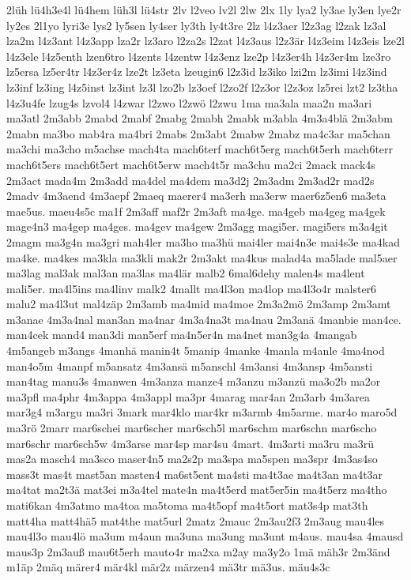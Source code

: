 {2lüh
lü4h3e4l
lü4hem
lüh3l
lü4str
2lv
l2veo
lv2l
2lw
2lx
1ly
lya2
ly3ae
ly3en
lye2r
ly2es
2l1yo
lyri3e
lys2
ly5sen
ly4ser
ly3th
ly4t3re
2lz
l4z3aer
l2z3ag
l2zak
lz3al
lza2m
l4z3ant
l4z3app
lza2r
lz3aro
l2za2s
l2zat
l4z3aus
l2z3är
l4z3eim
l4z3eis
lze2l
l4z3ele
l4z5enth
lzen6tro
l4zents
l4zentw
l4z3enz
lze2p
l4z3er4h
l4z3er4m
lze3ro
lz5ersa
lz5er4tr
l4z3er4z
lze2t
lz3eta
lzeugin6
l2z3id
lz3iko
lzi2m
lz3imi
l4z3ind
lz3inf
lz3ing
l4z5inst
lz3int
lz3l
lzo2b
lz3oef
l2zo2f
l2z3or
l2z3oz
lz5rei
lzt2
lz3tha
l4z3u4fe
lzug4s
lzvol4
l4zwar
l2zwo
l2zwö
l2zwu
1ma
ma3ala
maa2n
ma3ari
ma3atl
2m3abb
2mabd
2mabf
2mabg
2mabh
2mabk
m3abla
4m3a4blä
2m3abm
2mabn
ma3bo
mab4ra
ma4bri
2mabs
2m3abt
2mabw
2mabz
ma4c3ar
ma5chan
ma3chi
ma3cho
m5achse
mach4ta
mach6terf
mach6t5erg
mach6t5erh
mach6terr
mach6t5ers
mach6t5ert
mach6t5erw
mach4t5r
ma3chu
ma2ci
2mack
mack4s
2m3act
mada4m
2m3add
ma4del
ma4dem
ma3d2j
2m3adm
2m3ad2r
mad2s
2madv
4m3aend
4m3aepf
2maeq
maerer4
ma3erh
ma3erw
maer6z5en6
ma3eta
mae5us.
maeu4s5c
ma1f
2m3aff
maf2r
2m3aft
ma4ge.
ma4geb
ma4geg
ma4gek
mage4n3
ma4gep
ma4ges.
ma4gev
ma4gew
2m3agg
magi5er.
magi5ers
m3a4git
2magm
ma3g4n
ma3gri
mah4ler
ma3ho
ma3hü
mai4ler
mai4n3e
mai4s3e
ma4kad
ma4ke.
ma4kes
ma3kla
ma3kli
mak2r
2m3akt
ma4kus
malad4a
ma5lade
mal5aer
ma3lag
mal3ak
mal3an
ma3las
ma4lär
malb2
6mal6dehy
malen4s
ma4lent
mali5er.
ma4l5ins
ma4linv
malk2
4mallt
ma4l3on
ma4lop
ma4l3o4r
malster6
malu2
ma4l3ut
mal4zäp
2m3amb
ma4mid
ma4moe
2m3a2mö
2m3amp
2m3amt
m3anae
4m3a4nal
man3an
ma4nar
4m3a4na3t
ma4nau
2m3anä
4manbie
man4ce.
man4cek
mand4
man3di
man5erf
ma4n5er4n
ma4net
man3g4a
4mangab
4m5angeb
m3angs
4manhä
manin4t
5manip
4manke
4manla
m4anle
4ma4nod
man4o5m
4manpf
m5ansatz
4m3ansä
m5anschl
4m3ansi
4m3ansp
4m5ansti
man4tag
manu3s
4manwen
4m3anza
manze4
m3anzu
m3anzü
ma3o2b
ma2or
ma3pfl
ma4phr
4m3appa
4m3appl
ma3pr
4marag
mar4an
2m3arb
4m3area
mar3g4
m3argu
ma3ri
3mark
mar4klo
mar4kr
m3armb
4m5arme.
mar4o
maro5d
ma3rö
2marr
mar6schei
mar6scher
mar6sch5l
mar6schm
mar6schn
mar6scho
mar6schr
mar6sch5w
4m3arse
mar4sp
mar4su
4mart.
4m3arti
ma3ru
ma3rü
mas2a
masch4
ma3sco
maser4n5
ma2s2p
ma3spa
ma5spen
ma3spr
4m3as4so
mass3t
mas4t
mast5an
masten4
ma6st5ent
ma4sti
ma4t3ae
ma4t3an
ma4t3ar
ma4tat
ma2t3ä
mat3ei
m3a4tel
mate4n
ma4t5erd
mat5er5in
ma4t5erz
ma4tho
mati6kan
4m3atmo
ma4toa
ma5toma
ma4t5opf
ma4t5ort
mat3s4p
mat3th
matt4ha
matt4hä5
mat4the
mat5url
2matz
2mauc
2m3au2f3
2m3aug
mau4les
mau4l3o
mau4lö
ma3um
m4aun
ma3una
ma3ung
ma3unt
m4aus.
mau4sa
4mausd
maus3p
2m3auß
mau6t5erh
mauto4r
ma2xa
m2ay
ma3y2o
1mä
mäh3r
2m3änd
m1äp
2mäq
märer4
mär4kl
mär2z
märzen4
mä3tr
mä3us.
mäu4s3c
}
